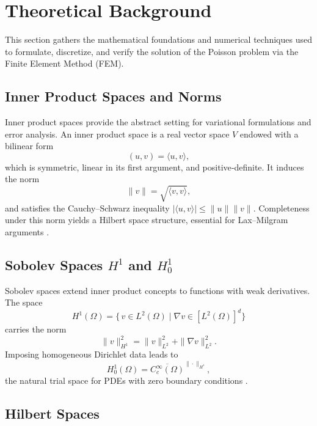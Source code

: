 \section{Theoretical Background}

This section gathers the mathematical foundations and numerical techniques used to formulate, discretize, and verify the solution of the Poisson problem via the Finite Element Method (FEM).

\subsection{Inner Product Spaces and Norms}

Inner product spaces provide the abstract setting for variational formulations and error analysis.  An inner product space is a real vector space $V$ endowed with a bilinear form
\begin{equation}
  (u,v) = \langle u,v\rangle,
\end{equation}
which is symmetric, linear in its first argument, and positive‐definite.  It induces the norm
\begin{equation}
  \|v\| = \sqrt{\langle v,v\rangle},
\end{equation}
and satisfies the Cauchy–Schwarz inequality $|\langle u,v\rangle|\le\|u\|\|v\|$.  Completeness under this norm yields a Hilbert space structure, essential for Lax–Milgram arguments \cite{inner_product_space}.

\subsection{Sobolev Spaces $H^1$ and $H_0^1$}

Sobolev spaces extend inner product concepts to functions with weak derivatives.  The space
\begin{equation}
  H^1(\Omega)
  = \{\,v\in L^2(\Omega)\mid \nabla v\in [L^2(\Omega)]^d\}
\end{equation}
carries the norm
\begin{equation}
  \|v\|_{H^1}^2 = \|v\|_{L^2}^2 + \|\nabla v\|_{L^2}^2.
\end{equation}
Imposing homogeneous Dirichlet data leads to
\begin{equation}
  H_0^1(\Omega)
  = \overline{C_c^\infty(\Omega)}^{\|\cdot\|_{H^1}},
\end{equation}
the natural trial space for PDEs with zero boundary conditions \cite{sobolev_space}.

\subsection{Hilbert Spaces}

